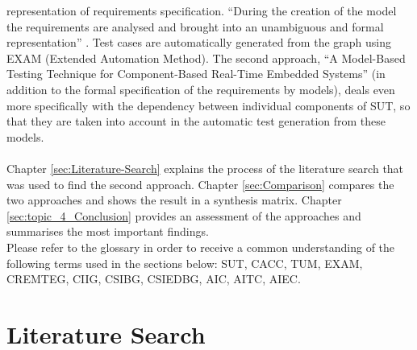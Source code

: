 representation of requirements specification. \enquote{During
the creation of the model the requirements are analysed and brought
into an unambiguous and formal representation} \cite{Siegl2010}.
Test cases are automatically generated from the graph using EXAM (Extended
Automation Method). The second approach, \enquote{A Model-Based
Testing Technique for Component-Based Real-Time Embedded Systems}
(in addition to the formal specification of the requirements by models),
deals even more specifically with the dependency between individual
components of SUT, so that they are taken into account in the automatic
test generation from these models.\\
 \\
Chapter \ref{sec:Literature-Search} explains the process of the literature
search that was used to find the second approach. Chapter \ref{sec:Comparison}
compares the two approaches and shows the result in a synthesis matrix.
Chapter \ref{sec:topic_4_Conclusion} provides an assessment of the approaches
and summarises the most important findings.\\
Please refer to the glossary in order to receive a common understanding of the following terms used in the sections below: SUT, CACC, TUM, EXAM, CREMTEG, CIIG, CSIBG, CSIEDBG, AIC, AITC, AIEC.

\section{Literature Search\label{sec:Literature-Search}}

